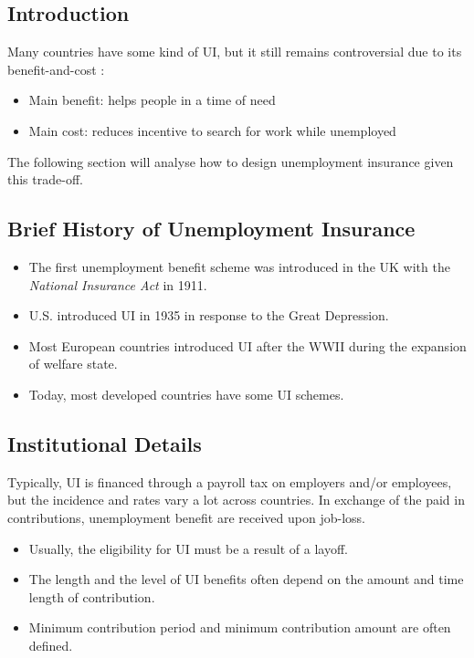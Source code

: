     \subsection{Introduction}
        Many countries have some kind of UI, but it still remains controversial due to its benefit-and-cost :
        \begin{itemize}
            \item Main benefit: helps people in a time of need
            \item Main cost: reduces incentive to search for work while unemployed
        \end{itemize}
        The following section will analyse how to design unemployment insurance given this trade-off.
        
    \subsection{Brief History of Unemployment Insurance}
        \begin{itemize}
            \item The first unemployment benefit scheme was introduced in the UK with the \textit{National Insurance Act} in 1911.
            \item U.S. introduced UI in 1935 in response to the Great Depression.
            \item Most European countries introduced UI after the WWII during the expansion of welfare state.
            \item Today, most developed countries have some UI schemes.
        \end{itemize}
        
    \subsection{Institutional Details}
        Typically, UI is financed through a payroll tax on employers and/or employees, but the incidence and rates vary a lot across countries. In exchange of the paid in contributions, unemployment benefit are received upon job-loss.
        \begin{itemize}
            \item Usually, the eligibility for UI must be a result of a layoff.
            \item The length and the level of UI benefits often depend on the amount and time length of contribution.
            \item Minimum contribution period and minimum contribution amount are often defined.
        \end{itemize}
        
